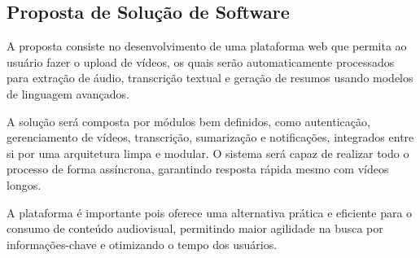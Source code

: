\subsection{Proposta de Solução de Software}
    A proposta consiste no desenvolvimento de uma plataforma web que permita ao usuário fazer o upload de vídeos, os quais serão automaticamente processados para extração de áudio, transcrição textual e geração de resumos usando modelos de linguagem avançados.

    A solução será composta por módulos bem definidos, como autenticação, gerenciamento de vídeos, transcrição, sumarização e notificações, integrados entre si por uma arquitetura limpa e modular. O sistema será capaz de realizar todo o processo de forma assíncrona, garantindo resposta rápida mesmo com vídeos longos.

    A plataforma é importante pois oferece uma alternativa prática e eficiente para o consumo de conteúdo audiovisual, permitindo maior agilidade na busca por informações-chave e otimizando o tempo dos usuários.
